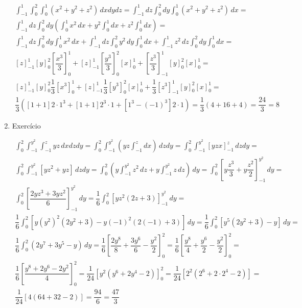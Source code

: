 \begin{enumerate}
	\begin{gather*}
		\int_{-1}^1 \int_0^2 \int_0^1 \left(x^2 + y^2 + z^2\right)\, dxdydz = \int_{-1}^1 dz \int_0^2 dy \int_0^1 \left(x^2 + y^2 + z^2\right)\, dx =\\ \int_{-1}^1 dz \int_0^2 dy\left( \int_0^1 x^2\, dx + y^2\int_0^1 dx + z^2\int_0^1 dx\right) =\\ \int_{-1}^1 dz \int_0^2 dy \int_0^1 x^2\, dx + \int_{-1}^1 dz \int_0^2 y^2\, dy \int_0^1 dx + \int_{-1}^1 z^2\, dz \int_0^2 dy \int_0^1 dx =\\ [z]_{-1}^1 [y]_0^2 \left[\dfrac{x^3}{3}\right]_0^1 + [z]_{-1}^1 \left[\dfrac{y^3}{3}\right]_0^2 [x]_0^1 + \left[\dfrac{z^3}{3}\right]_{-1}^1 [y]_0^2 [x]_0^1 =\\ [z]_{-1}^1 [y]_0^2 \dfrac{1}{3}\left[x^3\right]_0^1 + [z]_{-1}^1 \dfrac{1}{3}\left[y^3\right]_0^2 [x]_0^1 + \dfrac{1}{3}\left[z^3\right]_{-1}^1 [y]_0^2 [x]_0^1 =\\ \dfrac{1}{3}\left([1 + 1]2\cdot1^3 + [1 + 1]2^3\cdot1 + \left[1^3 - (-1)^3\right]2\cdot1\right) = \dfrac{1}{3}\left(4 + 16 + 4\right) = \dfrac{24}{3} = 8
	\end{gather*}
	
	\item Exercício
	
	\begin{gather*}
		\int_0^2 \int_{-1}^{y^2} \int_{-1}^z yz\, dxdzdy = \int_0^2 \int_{-1}^{y^2}\left(yz\int_{-1}^z dx\right)\, dzdy = \int_0^2 \int_{-1}^{y^2} [yzx]_{-1}^z\, dzdy =\\ \int_0^2 \int_{-1}^{y^2} [yz^2 + yz]\, dzdy = \int_0^2\left(y\int_{-1}^{y^2} z^2\, dz + y\int_{-1}^{y^2} z\, dz\right)\, dy = \int_0^2 \left[y\dfrac{z^3}{3} + y\dfrac{z^2}{2}\right]_{-1}^{y^2}\, dy =\\ \int_0^2 \left[\dfrac{2yz^3 + 3yz^2}{6}\right]_{-1}^{y^2}\, dy = \dfrac{1}{6} \int_0^2 \left[yz^2\left(2z + 3\right)\right]_{-1}^{y^2}\, dy =\\ \dfrac{1}{6} \int_0^2 \left[y\left(y^2\right)^2\left(2y^2 + 3\right) - y(-1)^2\left(2(-1) + 3\right)\right]\, dy = \dfrac{1}{6} \int_0^2 \left[y^5\left(2y^2 + 3\right) - y\right]\, dy =\\ \dfrac{1}{6} \int_0^2 \left(2y^7 + 3y^5 - y\right)\, dy = \dfrac{1}{6} \left[\dfrac{2y^8}{8} + \dfrac{3y^6}{6} - \dfrac{y^2}{2}\right]_0^2 = \dfrac{1}{6} \left[\dfrac{y^8}{4} + \dfrac{y^6}{2} - \dfrac{y^2}{2}\right]_0^2 =\\ \dfrac{1}{6} \left[\dfrac{y^8 + 2y^6 - 2y^2}{4}\right]_0^2 = \dfrac{1}{24}\left[y^2\left(y^6 + 2y^4 - 2\right)\right]_0^2 = \dfrac{1}{24}\left[2^2\left(2^6 + 2\cdot2^4 - 2\right)\right] =\\ \dfrac{1}{24} \left[4\left(64 + 32 - 2\right)\right] = \dfrac{94}{6} = \dfrac{47}{3}
	\end{gather*}
\end{enumerate}